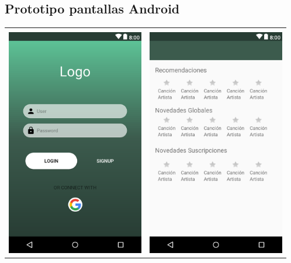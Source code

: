 \begin{itemize}
\begin{enumerate}
\begin{enumerate}
\begin{enumerate}
	    \end{enumerate}
    \end{enumerate}
\end{enumerate}

\end{itemize}


\subsection{Prototipo pantallas Android}
\begin{tabular}{ p{6cm} p{6cm}}
\hline
\\
\includegraphics[width=6cm]{Figures/android/Login.png}
&
\includegraphics[width=6cm]{Figures/android/home.png} \\

\end{tabular}
